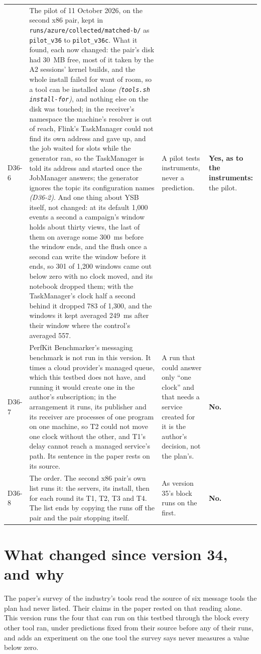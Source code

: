 \documentclass[11pt]{article}
\newcommand{\gl}[1]{{\color{soft}\itshape\small (#1)}}
\begin{document}
{\begin{longtable}{@{}p{1.1cm} >{\raggedright\arraybackslash}p{6.1cm} >{\raggedright\arraybackslash}p{6.0cm} >{\raggedright\arraybackslash}p{2.2cm}@{}}
D36-6 & The pilot of 11 October 2026, on the second x86 pair, kept in \texttt{runs/azure/collected/matched-b/} as \texttt{pilot\_v36} to \texttt{pilot\_v36c}. What it found, each now changed: the pair's disk had 30~MB free, most of it taken by the A2 sessions' kernel builds, and the whole install failed for want of room, so a tool can be installed alone \gl{\texttt{tools.sh install-for}}, and nothing else on the disk was touched; in the receiver's namespace the machine's resolver is out of reach, Flink's TaskManager could not find its own address and gave up, and the job waited for slots while the generator ran, so the TaskManager is told its address and started once the JobManager answers; the generator ignores the topic its configuration names \gl{D36-2}. And one thing about YSB itself, not changed: at its default 1,000 events a second a campaign's window holds about thirty views, the last of them on average some 300~ms before the window ends, and the flush once a second can write the window before it ends, so 301 of 1,200 windows came out below zero with no clock moved, and its notebook dropped them; with the TaskManager's clock half a second behind it dropped 783 of 1,300, and the windows it kept averaged 249~ms after their window where the control's averaged 557. & A pilot tests instruments, never a prediction. & \textbf{Yes, as to the instruments:} the pilot. \\
D36-7 & PerfKit Benchmarker's messaging benchmark is not run in this version. It times a cloud provider's managed queue, which this testbed does not have, and running it would create one in the author's subscription; in the arrangement it runs, its publisher and its receiver are processes of one program on one machine, so T2 could not move one clock without the other, and T1's delay cannot reach a managed service's path. Its sentence in the paper rests on its source. & A run that could answer only ``one clock'' and that needs a service created for it is the author's decision, not the plan's. & \textbf{No.} \\
D36-8 & The order. The second x86 pair's own list runs it: the servers, its install, then for each round its T1, T2, T3 and T4. The list ends by copying the runs off the pair and the pair stopping itself. & As version 35's block runs on the first. & \textbf{No.} \\
\bottomrule
\end{longtable}}

\section*{What changed since version 34, and why}
The paper's survey of the industry's tools read the source of six message tools the plan had never
listed. Their claims in the paper rested on that reading alone. This version runs the four that can
run on this testbed through the block every other tool ran, under predictions fixed from their
source before any of their runs, and adds an experiment on the one tool the survey says never
measures a value below zero.
\end{document}

